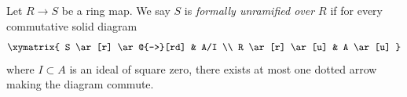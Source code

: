 \begin{definition}
\label{definition-formally-unramified}
Let $R \to S$ be a ring map.
We say $S$ is {\it formally unramified over $R$} if for every
commutative solid diagram
$$
\xymatrix{
S \ar[r] \ar@{-->}[rd] & A/I \\
R \ar[r] \ar[u] & A \ar[u]
}
$$
where $I \subset A$ is an ideal of square zero, there exists
at most one dotted arrow making the diagram commute.
\end{definition}